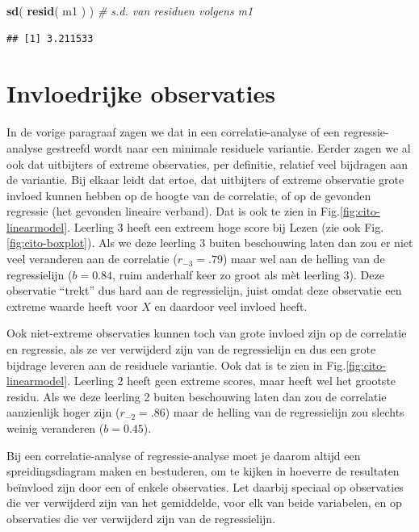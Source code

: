 \documentclass[
]{book}
\newenvironment{Shaded}{\begin{snugshade}}{\end{snugshade}}
\newcommand{\CommentTok}[1]{\textcolor[rgb]{0.56,0.35,0.01}{\textit{#1}}}
\newcommand{\FunctionTok}[1]{\textcolor[rgb]{0.13,0.29,0.53}{\textbf{#1}}}
\newcommand{\NormalTok}[1]{#1}
\begin{document}
\begin{Shaded}
\begin{Highlighting}[]
\FunctionTok{sd}\NormalTok{( }\FunctionTok{resid}\NormalTok{( m1 ) ) }\CommentTok{\# s.d. van residuen volgens \textasciigrave{}m1\textasciigrave{}}
\end{Highlighting}
\end{Shaded}

\begin{verbatim}
## [1] 3.211533
\end{verbatim}

\section{Invloedrijke observaties}\label{invloedrijke-observaties}

In de vorige paragraaf zagen we dat in een correlatie-analyse of een
regressie-analyse gestreefd wordt naar een minimale residuele variantie.
Eerder zagen we al ook dat uitbijters of extreme observaties, per
definitie, relatief veel bijdragen aan de variantie. Bij elkaar leidt
dat ertoe, dat uitbijters of extreme observatie grote invloed kunnen
hebben op de hoogte van de correlatie, of op de gevonden regressie (het
gevonden lineaire verband). Dat is ook te zien in
Fig.\ref{fig:cito-linearmodel}. Leerling 3 heeft een extreem hoge
score bij Lezen (zie ook
Fig.\ref{fig:cito-boxplot}). Als we deze leerling 3 buiten
beschouwing laten dan zou er niet veel veranderen aan de correlatie
(\(r_{-3}=.79\)) maar wel aan de helling van de regressielijn (\(b=0.84\),
ruim anderhalf keer zo groot als mèt leerling 3). Deze observatie
``trekt'' dus hard aan de regressielijn, juist omdat deze observatie een
extreme waarde heeft voor \(X\) en daardoor veel invloed heeft.

Ook niet-extreme observaties kunnen toch van grote invloed zijn op de
correlatie en regressie, als ze ver verwijderd zijn van de regressielijn
en dus een grote bijdrage leveren aan de residuele variantie. Ook dat is
te zien in Fig.\ref{fig:cito-linearmodel}.
Leerling 2 heeft geen extreme scores,
maar heeft wel het grootste residu. Als we deze leerling 2 buiten
beschouwing laten dan zou de correlatie aanzienlijk hoger zijn
(\(r_{-2}=.86\)) maar de helling van de regressielijn zou slechts weinig
veranderen (\(b=0.45\)).

Bij een correlatie-analyse of regressie-analyse moet je daarom altijd
een spreidingsdiagram maken en bestuderen, om te kijken in hoeverre de
resultaten beïnvloed zijn door een of enkele observaties. Let daarbij
speciaal op observaties die ver verwijderd zijn van het gemiddelde, voor
elk van beide variabelen, en op observaties die ver verwijderd zijn van
de regressielijn.
\end{document}
